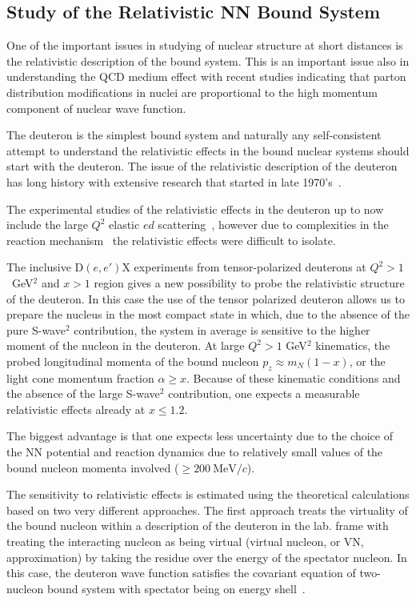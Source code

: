 \subsection{Study of the Relativistic NN Bound System}

One of the important issues in studying of nuclear structure  at short distances is the 
relativistic description of the bound system.  This is an important issue also in 
understanding the QCD medium effect with recent studies indicating that  parton distribution 
modifications  in nuclei are proportional to the high momentum component of nuclear wave function.

The deuteron is the simplest bound system and naturally any self-consistent attempt  to understand the 
relativistic effects in the bound nuclear systems  should start with the deuteron. 
The issue of the relativistic description of the deuteron has long history with extensive research that started in late 1970's~\cite{Gross:1982nz,Buck:1979ff,Frankfurt:1977vc,Frankfurt:1981mk}.

The experimental studies of the relativistic effects in the deuteron  up to now include the large $Q^2$ elastic 
$ed$ scattering~\cite{Alexa:1998fe}, however  
due to complexities  in the reaction mechanism~\cite{VanOrden:1995eg} the relativistic effects were 
difficult to isolate.

The inclusive D$(e,e')$X experiments from tensor-polarized deuterons at  $Q^2>1$~GeV$^2$ and $x>1$ region gives 
a new possibility to probe the relativistic structure of the deuteron.  In this case the use of the tensor polarized
deuteron allows us to prepare the nucleus in the most compact state in which, due to the absence of the 
pure S-wave$^2$ contribution, the system in average is sensitive to the higher moment of the nucleon in the deuteron.
At large $Q^2>1$ GeV$^2$ kinematics, the probed longitudinal momenta of the bound nucleon $p_z \approx m_N(1-x)$, 
or the light cone momentum fraction $\alpha \ge x$. Because of these kinematic conditions and the absence of the 
large S-wave$^2$ contribution, one expects a measurable relativistic effects already at $x\le 1.2$.  

The biggest advantage is that one expects less uncertainty due to the choice of the NN potential  and reaction dynamics due to relatively small values of the bound nucleon momenta involved ($\ge 200~\mathrm{MeV}/c$).

The sensitivity to relativistic effects is estimated using the theoretical calculations based on two 
very different approaches.   The first approach treats the  virtuality of the bound nucleon within a
description of the deuteron in the lab. frame  with treating the interacting nucleon as being 
virtual (virtual nucleon, or VN, approximation) 
by taking the residue over the energy of the spectator nucleon.
In this case, the deuteron wave function satisfies the covariant equation of two-nucleon bound system 
with spectator being on energy shell~\cite{Sargsian:2009hf,Gross:2010qm}.

